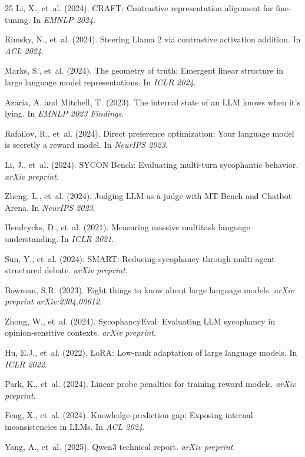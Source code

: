 \documentclass[11pt,a4paper]{article}
\begin{document}
\begin{thebibliography}{25}
Li, X., et~al. (2024).
\newblock CRAFT: Contrastive representation alignment for fine-tuning.
\newblock In \emph{EMNLP 2024}.

Rimsky, N., et~al. (2024).
\newblock Steering Llama 2 via contrastive activation addition.
\newblock In \emph{ACL 2024}.

Marks, S., et~al. (2024).
\newblock The geometry of truth: Emergent linear structure in large language model representations.
\newblock In \emph{ICLR 2024}.

Azaria, A. and Mitchell, T. (2023).
\newblock The internal state of an LLM knows when it's lying.
\newblock In \emph{EMNLP 2023 Findings}.

Rafailov, R., et~al. (2024).
\newblock Direct preference optimization: Your language model is secretly a reward model.
\newblock In \emph{NeurIPS 2023}.

Li, J., et~al. (2024).
\newblock SYCON Bench: Evaluating multi-turn sycophantic behavior.
\newblock \emph{arXiv preprint}.

Zheng, L., et~al. (2024).
\newblock Judging LLM-as-a-judge with MT-Bench and Chatbot Arena.
\newblock In \emph{NeurIPS 2023}.

Hendrycks, D., et~al. (2021).
\newblock Measuring massive multitask language understanding.
\newblock In \emph{ICLR 2021}.

Sun, Y., et~al. (2024).
\newblock SMART: Reducing sycophancy through multi-agent structured debate.
\newblock \emph{arXiv preprint}.

Bowman, S.R. (2023).
\newblock Eight things to know about large language models.
\newblock \emph{arXiv preprint arXiv:2304.00612}.

Zhong, W., et~al. (2024).
\newblock SycophancyEval: Evaluating LLM sycophancy in opinion-sensitive contexts.
\newblock \emph{arXiv preprint}.

Hu, E.J., et~al. (2022).
\newblock LoRA: Low-rank adaptation of large language models.
\newblock In \emph{ICLR 2022}.

Park, K., et~al. (2024).
\newblock Linear probe penalties for training reward models.
\newblock \emph{arXiv preprint}.

Feng, X., et~al. (2024).
\newblock Knowledge-prediction gap: Exposing internal inconsistencies in LLMs.
\newblock In \emph{ACL 2024}.

Yang, A., et~al. (2025).
\newblock Qwen3 technical report.
\newblock \emph{arXiv preprint}.

\end{thebibliography}
\end{document}
